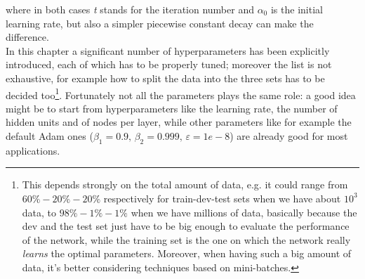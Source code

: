 \documentclass[12pt, a4paper]{report}
\theoremstyle{definition}
\begin{document}
where in both cases \textit{t} stands for the iteration number and $\alpha_0$ is the initial learning rate, but also a simpler piecewise constant decay can make the difference.\\
\newline \noindent In this chapter a significant number of hyperparameters has been explicitly introduced, each of which has to be properly tuned; moreover the list is not exhaustive, for example how to split the data into the three sets has to be decided too\footnote{This depends strongly on the total amount of data, e.g. it could range from $60\%-20\%-20\%$ respectively for train-dev-test sets when we have about $10^3$ data, to $98\%-1\%-1\%$ when we have millions of data, basically because the dev and the test set just have to be big enough to evaluate the performance of the network, while the training set is the one on which the network really \textit{learns} the optimal parameters. Moreover, when having such a big amount of data, it's better considering techniques based on mini-batches.}. Fortunately not all the parameters plays the same role: a good idea might be to start from hyperparameters like the learning rate, the number of hidden units and of nodes per layer, while other parameters like for example the default Adam ones ($\beta_1=0.9,\,\beta_2=0.999,\,\varepsilon=1e-8$) are already good for most applications. 



\end{document}

